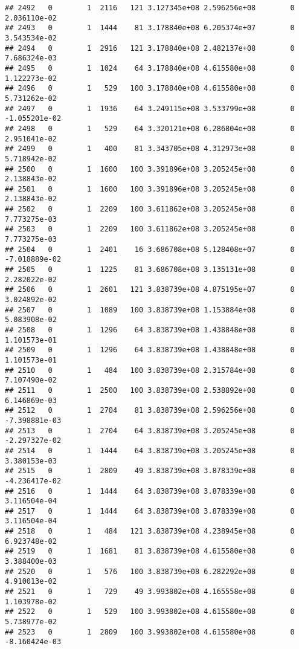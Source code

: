\documentclass[
]{article}
\begin{document}
\begin{enumerate}
\begin{verbatim}
## 2492   0        1  2116   121 3.127345e+08 2.596256e+08        0  2.036110e-02
## 2493   0        1  1444    81 3.178840e+08 6.205374e+07        0  3.543534e-02
## 2494   0        1  2916   121 3.178840e+08 2.482137e+08        0  7.686324e-03
## 2495   0        1  1024    64 3.178840e+08 4.615580e+08        0  1.122273e-02
## 2496   0        1   529   100 3.178840e+08 4.615580e+08        0  5.731262e-02
## 2497   0        1  1936    64 3.249115e+08 3.533799e+08        0 -1.055201e-02
## 2498   0        1   529    64 3.320121e+08 6.286804e+08        0  2.951041e-02
## 2499   0        1   400    81 3.343705e+08 4.312973e+08        0  5.718942e-02
## 2500   0        1  1600   100 3.391896e+08 3.205245e+08        0  2.138843e-02
## 2501   0        1  1600   100 3.391896e+08 3.205245e+08        0  2.138843e-02
## 2502   0        1  2209   100 3.611862e+08 3.205245e+08        0  7.773275e-03
## 2503   0        1  2209   100 3.611862e+08 3.205245e+08        0  7.773275e-03
## 2504   0        1  2401    16 3.686708e+08 5.128408e+07        0 -7.018889e-02
## 2505   0        1  1225    81 3.686708e+08 3.135131e+08        0  2.282022e-02
## 2506   0        1  2601   121 3.838739e+08 4.875195e+07        0  3.024892e-02
## 2507   0        1  1089   100 3.838739e+08 1.153884e+08        0  5.083908e-02
## 2508   0        1  1296    64 3.838739e+08 1.438848e+08        0  1.101573e-01
## 2509   0        1  1296    64 3.838739e+08 1.438848e+08        0  1.101573e-01
## 2510   0        1   484   100 3.838739e+08 2.315784e+08        0  7.107490e-02
## 2511   0        1  2500   100 3.838739e+08 2.538892e+08        0  6.146869e-03
## 2512   0        1  2704    81 3.838739e+08 2.596256e+08        0 -7.398881e-03
## 2513   0        1  2704    64 3.838739e+08 3.205245e+08        0 -2.297327e-02
## 2514   0        1  1444    64 3.838739e+08 3.205245e+08        0  3.380153e-03
## 2515   0        1  2809    49 3.838739e+08 3.878339e+08        0 -4.236417e-02
## 2516   0        1  1444    64 3.838739e+08 3.878339e+08        0  3.116504e-04
## 2517   0        1  1444    64 3.838739e+08 3.878339e+08        0  3.116504e-04
## 2518   0        1   484   121 3.838739e+08 4.238945e+08        0  6.923748e-02
## 2519   0        1  1681    81 3.838739e+08 4.615580e+08        0  3.388400e-03
## 2520   0        1   576   100 3.838739e+08 6.282292e+08        0  4.910013e-02
## 2521   0        1   729    49 3.993802e+08 4.165558e+08        0  1.103978e-02
## 2522   0        1   529   100 3.993802e+08 4.615580e+08        0  5.738977e-02
## 2523   0        1  2809   100 3.993802e+08 4.615580e+08        0 -8.160424e-03

\end{verbatim}
\end{enumerate}
\end{document}
